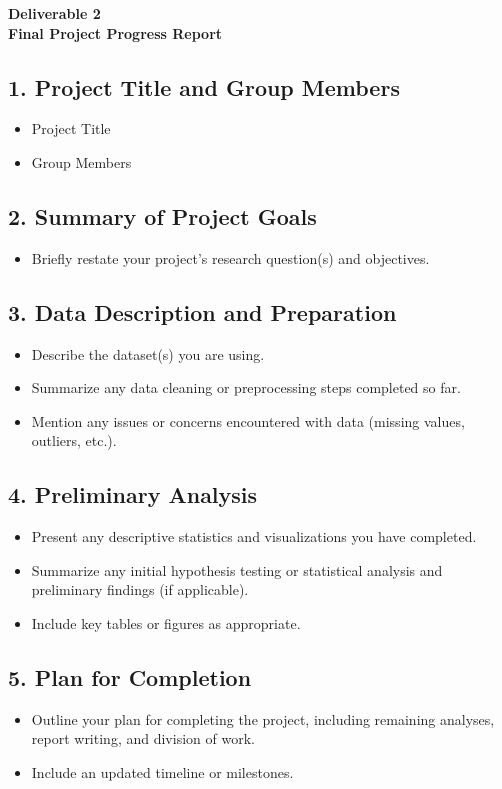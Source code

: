 \documentclass[12pt]{article}
\begin{document}
\begin{center}
\textbf{\Large Deliverable 2 \\ Final Project Progress Report} 
\end{center}

\subsection*{1. Project Title and Group Members}
\begin{itemize}
    \item Project Title
    \item Group Members
\end{itemize}

\subsection*{2. Summary of Project Goals}
\begin{itemize}
    \item Briefly restate your project’s research question(s) and objectives.
\end{itemize}

\subsection*{3. Data Description and Preparation}
\begin{itemize}
    \item Describe the dataset(s) you are using.  
    \item Summarize any data cleaning or preprocessing steps completed so far.  
    \item Mention any issues or concerns encountered with data (missing values, outliers, etc.).
\end{itemize}

\subsection*{4. Preliminary Analysis}
\begin{itemize}
    \item Present any descriptive statistics and visualizations you have completed.  
    \item Summarize any initial hypothesis testing or statistical analysis and preliminary findings (if applicable).  
    \item Include key tables or figures as appropriate.
\end{itemize}


\subsection*{5. Plan for Completion}
\begin{itemize}
    \item Outline your plan for completing the project, including remaining analyses, report writing, and division of work.  
    \item Include an updated timeline or milestones.
\end{itemize}
\end{document}
